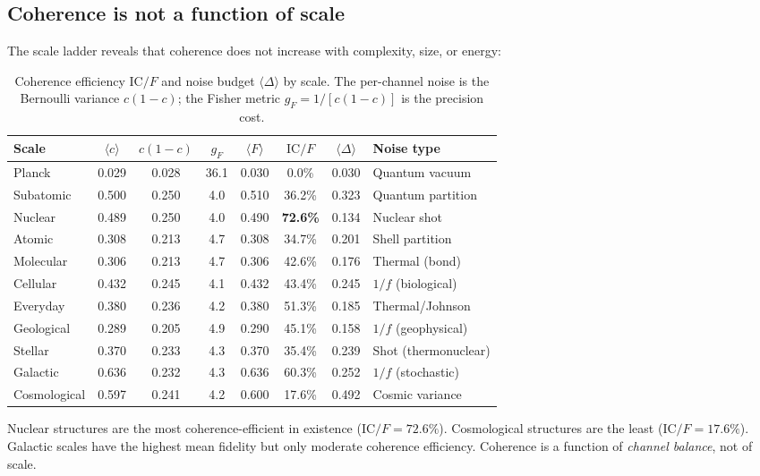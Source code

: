 \documentclass[
  aps,
  prd,
  twocolumn,
  superscriptaddress,
  nofootinbib,
  floatfix
]{revtex4-2}
\newcommand{\IC}{\mathrm{IC}}
\newcommand{\gF}{g_{\!F}}
\begin{document}
\subsection{Coherence is not a function of scale}\label{sec:coherence-scale}

The scale ladder reveals that coherence does not increase with
complexity, size, or energy:

\begin{table}[t]
\caption{\label{tab:coherence-ratio}Coherence efficiency $\IC/F$
and noise budget $\langle\Delta\rangle$ by scale.
The per-channel noise is the Bernoulli variance $c(1{-}c)$;
the Fisher metric $\gF = 1/[c(1{-}c)]$ is the precision cost.}
\begin{ruledtabular}
\begin{tabular}{lccccccl}
Scale & $\langle c \rangle$ & $c(1{-}c)$ & $\gF$ &
  $\langle F \rangle$ & $\IC/F$ & $\langle \Delta \rangle$ &
  Noise type \\
\midrule
Planck       & 0.029 & 0.028 & 36.1 & 0.030 &   0.0\% & 0.030 & Quantum vacuum \\
Subatomic    & 0.500 & 0.250 &  4.0 & 0.510 &  36.2\% & 0.323 & Quantum partition \\
Nuclear      & 0.489 & 0.250 &  4.0 & 0.490 & \textbf{72.6\%} & 0.134 & Nuclear shot \\
Atomic       & 0.308 & 0.213 &  4.7 & 0.308 &  34.7\% & 0.201 & Shell partition \\
Molecular    & 0.306 & 0.213 &  4.7 & 0.306 &  42.6\% & 0.176 & Thermal (bond) \\
Cellular     & 0.432 & 0.245 &  4.1 & 0.432 &  43.4\% & 0.245 & $1/f$ (biological) \\
Everyday     & 0.380 & 0.236 &  4.2 & 0.380 &  51.3\% & 0.185 & Thermal/Johnson \\
Geological   & 0.289 & 0.205 &  4.9 & 0.290 &  45.1\% & 0.158 & $1/f$ (geophysical) \\
Stellar      & 0.370 & 0.233 &  4.3 & 0.370 &  35.4\% & 0.239 & Shot (thermonuclear) \\
Galactic     & 0.636 & 0.232 &  4.3 & 0.636 &  60.3\% & 0.252 & $1/f$ (stochastic) \\
Cosmological & 0.597 & 0.241 &  4.2 & 0.600 &  17.6\% & 0.492 & Cosmic variance \\
\end{tabular}
\end{ruledtabular}
\end{table}

Nuclear structures are the most coherence-efficient in existence
($\IC/F = 72.6\%$).  Cosmological structures are the least
($\IC/F = 17.6\%$).  Galactic scales have the highest mean fidelity
but only moderate coherence efficiency.  Coherence is a function of
\emph{channel balance}, not of scale.
\end{document}
